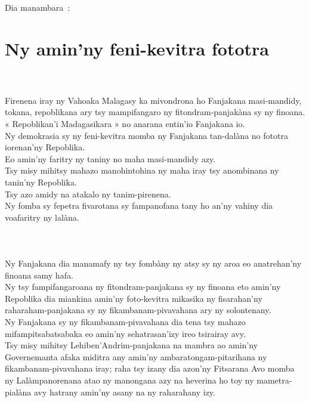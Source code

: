 \documentclass[12pt]{article}
\newcounter{laharana}
\newcommand{\andininy}[0]{
  \paragraph{%
    \NoCaseChange{%
      Andininy~\addtocounter{laharana}{1}\thelaharana.}\label{and:\thelaharana}~%
  }%
}
\begin{document}
\begin{center}
  Dia manambara~:
\end{center}

\section{Ny amin'ny feni-kevitra fototra}
\label{sec:ny-aminny-feni}

\andininy{} Firenena iray ny Vahoaka Malagasy ka mivondrona ho Fanjakana
masi-mandidy, tokana, repoblikana ary tsy mampifangaro ny fitondram-panjakàna sy
ny finoana.\\

\noindent
« Repoblikan'i Madagasikara » no anarana entin'io Fanjakana io.\\

\noindent
Ny demokrasia sy ny feni-kevitra momba ny Fanjakana tan-dalàna no fototra
iorenan'ny Repoblika.\\

\noindent
Eo amin'ny faritry ny taniny no maha
masi-mandidy azy.\\

\noindent
Tsy misy mihitsy mahazo manohintohina ny maha iray tsy anombinana ny
tanin'ny Repoblika.\\

\noindent
Tsy azo amidy na atakalo ny tanim-pirenena.\\

\noindent
Ny fomba sy fepetra fivarotana sy fampanofana tany ho an'ny vahiny dia
voafaritry ny lalàna.

\andininy{}Ny Fanjakana dia manamafy ny tsy fombàny ny atsy sy ny aroa eo
anatrehan'ny finoana samy hafa.\\

\noindent
Ny tsy fampifangaroana ny fitondram-panjakana sy ny finoana eto amin'ny
Repoblika dia miankina amin'ny foto-kevitra mikasika ny fisarahan'ny
raharaham-panjakana sy ny fikambanam-pivavahana ary ny solontenany.\\

\noindent
Ny Fanjakana sy ny fikambanam-pivavahana dia tena tsy mahazo mifampitsabatsabaka
eo amin'ny sehatrasan'izy ireo tsirairay avy.\\

\noindent
Tsy misy mihitsy Lehiben'Andrim-panjakana na mambra ao amin'ny Governemanta
afaka miditra any amin'ny ambaratongam-pitarihana ny fikambanam-pivavahana iray;
raha tsy izany dia azon'ny Fitsarana Avo momba ny Lalàmpanorenana atao ny
manongana azy na heverina ho toy ny mametra-pialàna avy hatrany amin'ny asany na
ny raharahany izy.
\end{document}
